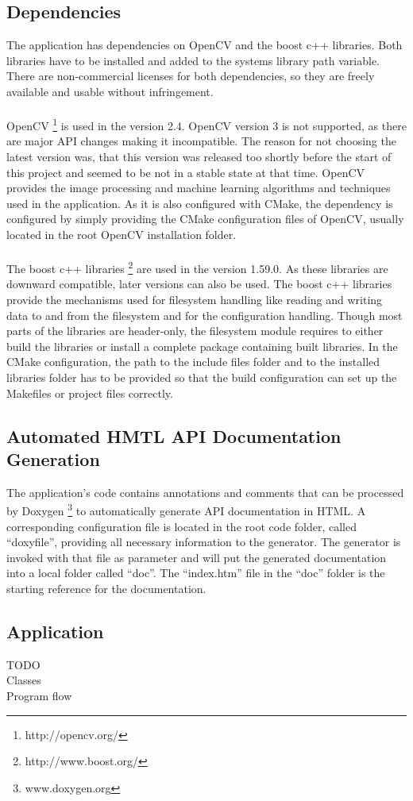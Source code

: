 \subsection{Dependencies}

The application has dependencies on OpenCV and the boost c++ libraries. Both libraries have to be installed and added to the systems library path variable. There are non-commercial licenses for both dependencies, so they are freely available and usable without infringement.
\\
\\
OpenCV \footnote{http://opencv.org/} is used in the version 2.4. OpenCV version 3 is not supported, as there are major API changes making it incompatible. The reason for not choosing the latest version was, that this version was released too shortly before the start of this project and seemed to be not in a stable state at that time. OpenCV provides the image processing and machine learning algorithms and techniques used in the application. As it is also configured with CMake, the dependency is configured by simply providing the CMake configuration files of OpenCV, usually located in the root OpenCV installation folder.
\\
\\
The boost c++ libraries \footnote{http://www.boost.org/} are used in the version 1.59.0. As these libraries are downward compatible, later versions can also be used. The boost c++ libraries provide the mechanisms used for filesystem handling like reading and writing data to and from the filesystem and for the configuration handling. Though most parts of the libraries are header-only, the filesystem module requires to either build the libraries or install a complete package containing built libraries. In the CMake configuration, the path to the include files folder and to the installed libraries folder has to be provided so that the build configuration can set up the Makefiles or project files correctly.


\subsection{Automated HMTL API Documentation Generation}

The application's code contains annotations and comments that can be processed by Doxygen \footnote{www.doxygen.org} to automatically generate API documentation in HTML. A corresponding configuration file is located in the root code folder, called "`doxyfile"', providing all necessary information to the generator. The generator is invoked with that file as parameter and will put the generated documentation into a local folder called "`doc"'. The "`index.htm"' file in the "`doc"' folder is the starting reference for the documentation.


\subsection{Application}

TODO
\\
Classes
\\
Program flow
